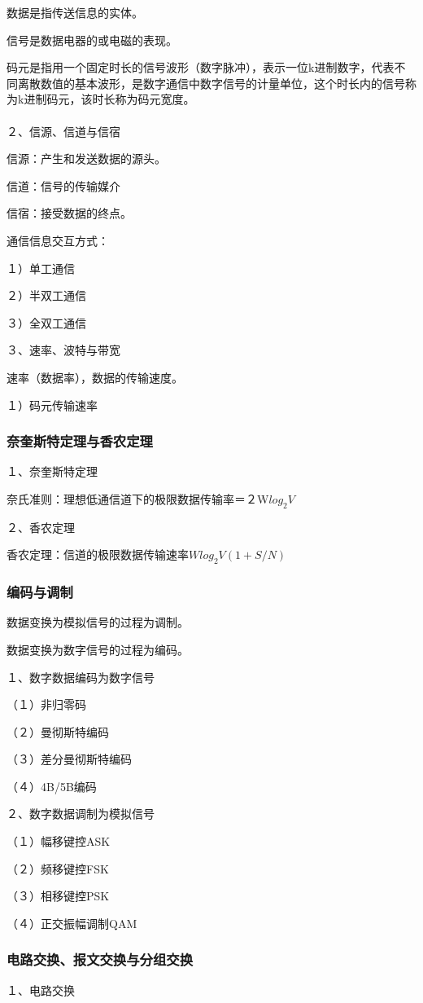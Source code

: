 \documentclass{ctexart}
\begin{document}
数据是指传送信息的实体。

信号是数据电器的或电磁的表现。

码元是指用一个固定时长的信号波形（数字脉冲），表示一位k进制数字，代表不同离散数值的基本波形，是数字通信中数字信号的计量单位，这个时长内的信号称为k进制码元，该时长称为码元宽度。
\\\\
２、信源、信道与信宿

信源：产生和发送数据的源头。

信道：信号的传输媒介

信宿：接受数据的终点。

通信信息交互方式：

１）单工通信

２）半双工通信

３）全双工通信

３、速率、波特与带宽

速率（数据率），数据的传输速度。

１）码元传输速率

\subsubsection{奈奎斯特定理与香农定理}
１、奈奎斯特定理

奈氏准则：理想低通信道下的极限数据传输率＝２W$log_2 V$

２、香农定理

香农定理：信道的极限数据传输速率$Wlog_2 V(1+S/N)$
\subsubsection{编码与调制}
数据变换为模拟信号的过程为调制。

数据变换为数字信号的过程为编码。

１、数字数据编码为数字信号

（１）非归零码

（２）曼彻斯特编码

（３）差分曼彻斯特编码

（４）4B/5B编码

２、数字数据调制为模拟信号

（１）幅移键控ASK

（２）频移键控FSK

（３）相移键控PSK

（４）正交振幅调制QAM

\subsubsection{电路交换、报文交换与分组交换}
１、电路交换
\end{document}
